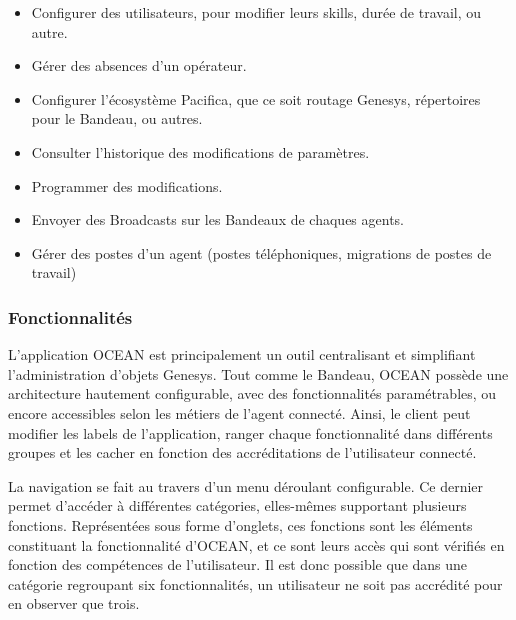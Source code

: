 \documentclass{rapport}
\begin{document}
\begin{itemize}
\item Configurer des utilisateurs, pour modifier leurs skills, durée de travail, ou autre.
\item Gérer des absences d'un opérateur.
\item Configurer l'écosystème Pacifica, que ce soit routage Genesys, répertoires pour le Bandeau, ou autres.
\item Consulter l'historique des modifications de paramètres.
\item Programmer des modifications.
\item Envoyer des Broadcasts sur les Bandeaux de chaques agents.
\item Gérer des postes d'un agent (postes téléphoniques, migrations de postes de travail)
\end{itemize}

\subsubsection{Fonctionnalités}

L'application OCEAN est principalement un outil centralisant et simplifiant l'administration d'objets Genesys. Tout comme le Bandeau, OCEAN possède une architecture hautement configurable, avec des fonctionnalités paramétrables, ou encore accessibles selon les métiers de l’agent connecté. Ainsi, le client peut modifier les labels de l'application, ranger chaque fonctionnalité dans différents groupes et les cacher en fonction des accréditations de l'utilisateur connecté.


\begin{minipage}{0.55\textwidth}

La navigation se fait au travers d'un menu déroulant configurable. Ce dernier permet d'accéder à différentes catégories, elles-mêmes supportant plusieurs fonctions. Représentées sous forme d'onglets, ces fonctions sont les éléments constituant la fonctionnalité d'OCEAN, et ce sont leurs accès qui sont vérifiés en fonction des compétences de l'utilisateur. Il est donc possible que dans une catégorie regroupant six fonctionnalités, un utilisateur ne soit pas accrédité pour en observer que trois.

\end{minipage}
\begin{minipage}{0.45\textwidth}
\end{minipage}
\vspace{5mm} %
\noindent
\\
\end{document}
